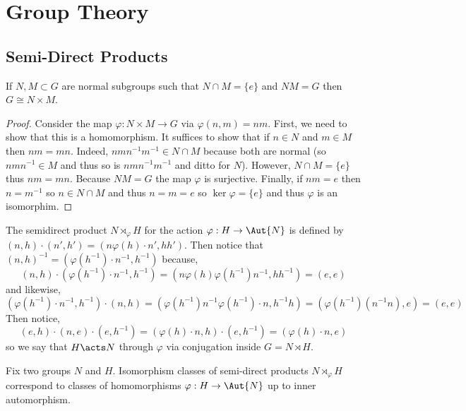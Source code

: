 \documentclass[12pt]{article}
\begin{document}
\section{Group Theory}

\subsection{Semi-Direct Products}

\begin{prop}
If $N, M \subset G$ are normal subgroups such that $N \cap M = \{ e \}$ and $NM = G$ then $G \cong N \times M$.
\end{prop}

\begin{proof}
Consider the map $\varphi : N \times M \to G$ via $\varphi(n,m) = nm$. First, we need to show that this is a homomorphism. It suffices to show that if $n \in N$ and $m \in M$ then $nm = mn$. Indeed, $nmn^{-1}m^{-1} \in N \cap M$ because both are normal (so $n m n^{-1} \in M$ and thus so is $n m n^{-1} m^{-1}$ and ditto for $N$). However, $N \cap M = \{ e \}$ thus $nm = mn$. Because $NM = G$ the map $\varphi$ is surjective. Finally, if $nm = e$ then $n = m^{-1}$ so $n \in N \cap M$ and thus $n = m = e$ so $\ker{\varphi} = \{ e \}$ and thus $\varphi$ is an isomorphim.
\end{proof}

\begin{rmk}
The semidirect product $N \rtimes_{\varphi} H$ for the action $\varphi : H \to \Aut{N}$ is defined by $(n,h) \cdot (n', h') = (n \varphi(h) \cdot n', h h')$. Then notice that $(n, h)^{-1} = (\varphi(h^{-1}) \cdot n^{-1}, h^{-1})$ because,
\[ (n, h) \cdot (\varphi(h^{-1}) \cdot n^{-1}, h^{-1}) = (n \varphi(h) \varphi(h^{-1}) n^{-1}, h h^{-1}) = (e,e) \]
and likewise,
\[ (\varphi(h^{-1}) \cdot n^{-1}, h^{-1}) \cdot (n, h) = (\varphi(h^{-1}) n^{-1} \varphi(h^{-1}) \cdot n, h^{-1} h) = (\varphi(h^{-1}) (n^{-1} n), e) = (e, e) \]
Then notice,
\[ (e, h) \cdot (n, e) \cdot (e, h^{-1}) = (\varphi(h) \cdot n, h) \cdot (e, h^{-1}) = (\varphi(h) \cdot n, e) \]
so we say that $H \acts N$ through $\varphi$ via conjugation inside $G = N \rtimes H$. 
\end{rmk}

\begin{prop}
Fix two groups $N$ and $H$. Isomorphism classes of semi-direct products $N \rtimes_\varphi H$ correspond to classes of homomorphisms $\varphi : H \to \Aut{N}$ up to inner automorphism.
\end{prop}
\end{document}
